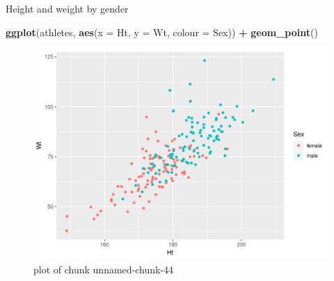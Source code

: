 \documentclass[ignorenonframetext,]{beamer}
\newenvironment{Shaded}{\begin{snugshade}}{\end{snugshade}}
\newcommand{\DataTypeTok}[1]{\textcolor[rgb]{0.13,0.29,0.53}{#1}}
\newcommand{\KeywordTok}[1]{\textcolor[rgb]{0.13,0.29,0.53}{\textbf{#1}}}
\newcommand{\NormalTok}[1]{#1}
\newcommand{\OperatorTok}[1]{\textcolor[rgb]{0.81,0.36,0.00}{\textbf{#1}}}
\newcommand{\StringTok}[1]{\textcolor[rgb]{0.31,0.60,0.02}{#1}}
\begin{document}
\begin{frame}[fragile]{Height and weight by gender}
\protect\hypertarget{height-and-weight-by-gender}{}

\begin{Shaded}
\begin{Highlighting}[]
\KeywordTok{ggplot}\NormalTok{(athletes, }\KeywordTok{aes}\NormalTok{(}\DataTypeTok{x =}\NormalTok{ Ht, }\DataTypeTok{y =}\NormalTok{ Wt, }\DataTypeTok{colour =}\NormalTok{ Sex)) }\OperatorTok{+}
\StringTok{  }\KeywordTok{geom_point}\NormalTok{()}
\end{Highlighting}
\end{Shaded}

\begin{figure}
\centering
\includegraphics{figure/unnamed-chunk-44-1.png}
\caption{plot of chunk unnamed-chunk-44}
\end{figure}

\end{frame}
\end{document}
